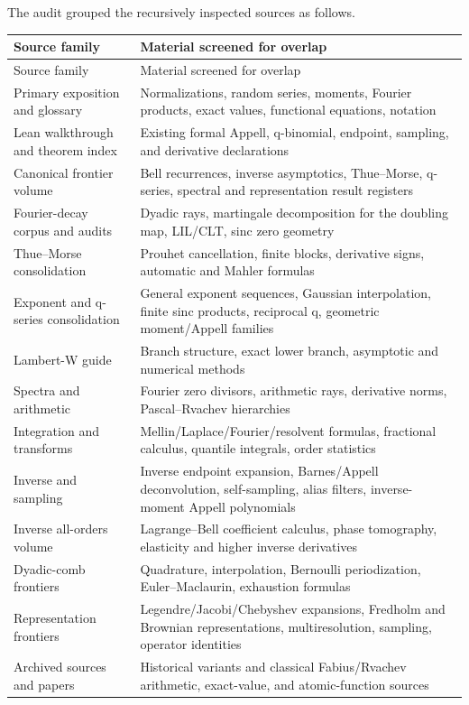 \documentclass[11pt,a4paper]{article}
\theoremstyle{definition}
\theoremstyle{remark}
\begin{document}
The audit grouped the recursively inspected sources as follows.
\begin{longtable}{@{}p{}p{}@{}}
\toprule
Source family & Material screened for overlap \\
\midrule
\endfirsthead
\toprule
Source family & Material screened for overlap \\
\midrule
\endhead
Primary exposition and glossary & Normalizations, random series, moments, Fourier products, exact values, functional equations, notation \\
Lean walkthrough and theorem index & Existing formal Appell, q-binomial, endpoint, sampling, and derivative declarations \\
Canonical frontier volume & Bell recurrences, inverse asymptotics, Thue--Morse, q-series, spectral and representation result registers \\
Fourier-decay corpus and audits & Dyadic rays, martingale decomposition for the doubling map, LIL/CLT, sinc zero geometry \\
Thue--Morse consolidation & Prouhet cancellation, finite blocks, derivative signs, automatic and Mahler formulas \\
Exponent and q-series consolidation & General exponent sequences, Gaussian interpolation, finite sinc products, reciprocal q, geometric moment/Appell families \\
Lambert-W guide & Branch structure, exact lower branch, asymptotic and numerical methods \\
Spectra and arithmetic & Fourier zero divisors, arithmetic rays, derivative norms, Pascal--Rvachev hierarchies \\
Integration and transforms & Mellin/Laplace/Fourier/resolvent formulas, fractional calculus, quantile integrals, order statistics \\
Inverse and sampling & Inverse endpoint expansion, Barnes/Appell deconvolution, self-sampling, alias filters, inverse-moment Appell polynomials \\
Inverse all-orders volume & Lagrange--Bell coefficient calculus, phase tomography, elasticity and higher inverse derivatives \\
Dyadic-comb frontiers & Quadrature, interpolation, Bernoulli periodization, Euler--Maclaurin, exhaustion formulas \\
Representation frontiers & Legendre/Jacobi/Chebyshev expansions, Fredholm and Brownian representations, multiresolution, sampling, operator identities \\
Archived sources and papers & Historical variants and classical Fabius/Rvachev arithmetic, exact-value, and atomic-function sources \\
\bottomrule
\end{longtable}
\end{document}
